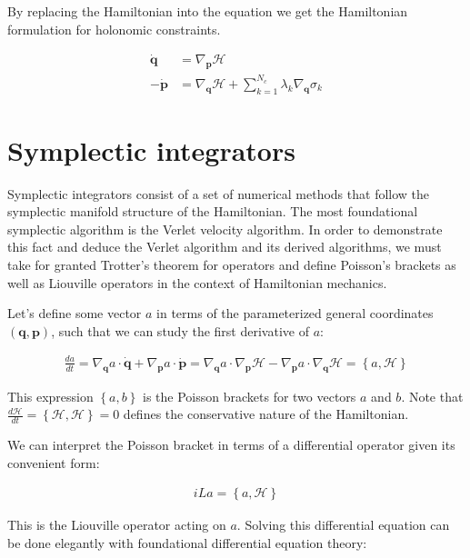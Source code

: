 \documentclass[draft]{agujournal2019}
\begin{document}
\begin{definition}
By replacing the Hamiltonian into the equation we get the Hamiltonian formulation for holonomic constraints.

\begin{align*}
    \dot{\mathbf{q}} &= \nabla_{\mathbf{p}} \mathcal{H} \\
    - \dot{\mathbf{p}} &= \nabla_{\mathbf{q}} \mathcal{H} + \sum_{k = 1}^{N_c} \lambda_k \nabla_{\mathbf{q}} \sigma_k
\end{align*}

\section{Symplectic integrators}

Symplectic integrators consist of a set of numerical methods that follow the symplectic manifold structure of the Hamiltonian. The most foundational symplectic algorithm is the Verlet velocity algorithm. In order to demonstrate this fact and deduce the Verlet algorithm and its derived algorithms, we must take for granted Trotter's theorem for operators and define Poisson's brackets as well as Liouville operators in the context of Hamiltonian mechanics.

Let's define some vector $a$ in terms of the parameterized general coordinates $(\mathbf{q}, \mathbf{p})$, such that we can study the first derivative of $a$:

\begin{align*}
    \frac{da}{dt} = \nabla_{\mathbf{q}} a \cdot \dot{\mathbf{q}}+ \nabla_{\mathbf{p}} a \cdot \dot{\mathbf{p}} = \nabla_{\mathbf{q}} a \cdot \nabla_{\mathbf{p}} \mathcal{H} - \nabla_{\mathbf{p}} a \cdot \nabla_{\mathbf{q}} \mathcal{H} = \left\{ a, \mathcal{H}\right\}
\end{align*}

This expression $\left\{ a, b\right\}$ is the Poisson brackets for two vectors $a$ and $b$. Note that $\frac{d\mathcal{H}}{dt} = \left\{ \mathcal{H}, \mathcal{H} \right\} = 0$ defines the conservative nature of the Hamiltonian.

We can interpret the Poisson bracket in terms of a differential operator given its convenient form:

\begin{align*}
    iLa = \left\{ a, \mathcal{H} \right\}
\end{align*}

This is the Liouville operator acting on $a$. Solving this differential equation can be done elegantly with foundational differential equation theory:


\end{definition}
\end{document}
